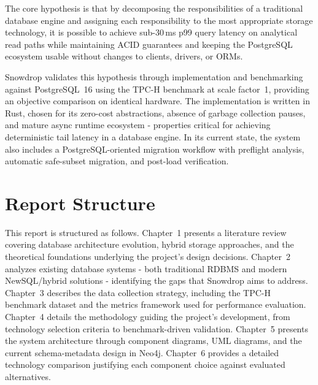 The core hypothesis is that by decomposing the responsibilities of a traditional database engine and assigning each responsibility to the most appropriate storage technology, it is possible to achieve sub-30\,ms p99 query latency on analytical read paths while maintaining ACID guarantees and keeping the PostgreSQL ecosystem usable without changes to clients, drivers, or ORMs.

Snowdrop validates this hypothesis through implementation and benchmarking against PostgreSQL~16 using the TPC-H benchmark at scale factor~1, providing an objective comparison on identical hardware. The implementation is written in Rust, chosen for its zero-cost abstractions, absence of garbage collection pauses, and mature async runtime ecosystem - properties critical for achieving deterministic tail latency in a database engine. In its current state, the system also includes a PostgreSQL-oriented migration workflow with preflight analysis, automatic safe-subset migration, and post-load verification.

\section{Report Structure}

This report is structured as follows. Chapter~1 presents a literature review covering database architecture evolution, hybrid storage approaches, and the theoretical foundations underlying the project's design decisions. Chapter~2 analyzes existing database systems - both traditional RDBMS and modern NewSQL/hybrid solutions - identifying the gaps that Snowdrop aims to address. Chapter~3 describes the data collection strategy, including the TPC-H benchmark dataset and the metrics framework used for performance evaluation. Chapter~4 details the methodology guiding the project's development, from technology selection criteria to benchmark-driven validation. Chapter~5 presents the system architecture through component diagrams, UML diagrams, and the current schema-metadata design in Neo4j. Chapter~6 provides a detailed technology comparison justifying each component choice against evaluated alternatives.

